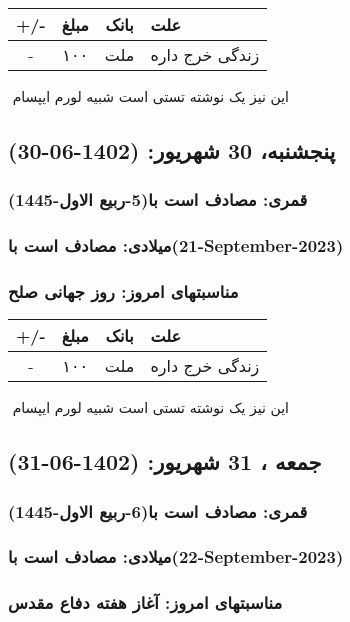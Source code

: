 \documentclass{article}
\newcommand{\rnote}[1]{\marginpar{\textcolor{color}{\StrSubstitute{\##1}{ }{\_}}}}
\newcommand{\myRow}[4]{
    #1 & #2 & #3 & #4 \\ \hline
}
\begin{document}
\begin{tabular}{ | c | c | c | p{5cm} |}
    \hline
    \myRow{ +/- }{مبلغ}{بانک}{علت}
    \myRow{-}{۱۰۰}{ملت}{زندگی خرج داره}
\end{tabular}
\newline
\newline

‌
\rnote{تست}
این نیز یک نوشته تستی است شبیه لورم ایپسام




\newpage
{}
\textcolor{color}{
\section{ پنجشنبه، 30 شهریور: (1402-06-30) }
\subsubsection*{قمری: مصادف است با(5-ربیع الاول-1445)} 
\subsubsection*{میلادی: مصادف است با(21-September-2023)}
\subsubsection*{مناسبتهای امروز: روز جهانی صلح}
}


\begin{tabular}{ | c | c | c | p{5cm} |}
    \hline
    \myRow{ +/- }{مبلغ}{بانک}{علت}
    \myRow{-}{۱۰۰}{ملت}{زندگی خرج داره}
\end{tabular}
\newline
\newline

‌
\rnote{تست}
این نیز یک نوشته تستی است شبیه لورم ایپسام




\newpage
{}
\textcolor{color}{
\section{ جمعه ، 31 شهریور: (1402-06-31) }
\subsubsection*{قمری: مصادف است با(6-ربیع الاول-1445)} 
\subsubsection*{میلادی: مصادف است با(22-September-2023)}
\subsubsection*{مناسبتهای امروز: آغاز هفته دفاع مقدس}
}
\end{document}
